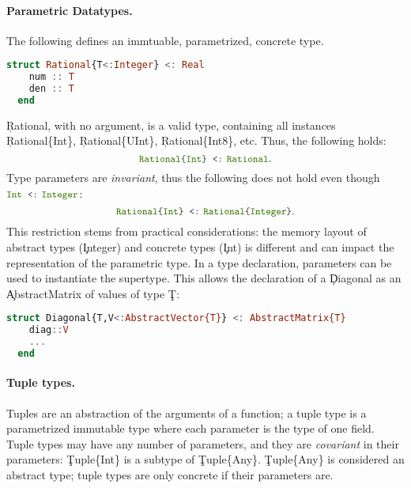 \paragraph{Parametric Datatypes.}
The following defines an immtuable, para\-metrized, concrete type.
\begin{lstlisting}[language=julia]
  struct Rational{T<:Integer} <: Real
    num :: T
    den :: T
  end
\end{lstlisting}
\noindent
\c{Rational}, with no argument, is a valid type, containing all instances
\c{Rational\{Int\}}, \c{Rational\{UInt\}}, \c{Rational\{Int8\}},
etc.  Thus, the following holds:
\[ \texttt{\small\color{jlbuiltin} Rational}   \texttt{\small\color{jlkeyword} \{}   \texttt{\small\color{jlbuiltin}\color{jlbuiltin} Int}   \texttt{\small\color{jlkeyword} \}\kern0pt}  \,\,\, \texttt{\small\color{jlkeyword} <:}\,\,   \texttt{\small\color{jlbuiltin} Rational}. \]
Type parameters are \emph{invariant}, thus the following does not hold
even though \( \texttt{\small\color{jlbuiltin}\color{jlbuiltin} Int} \,\,\, \texttt{\small\color{jlkeyword} <:}\,\, \texttt{\small\color{jlbuiltin}\color{jlbuiltin} Integer} \):
\[ \texttt{\small\color{jlbuiltin} Rational}   \texttt{\small\color{jlkeyword} \{}   \texttt{\small\color{jlbuiltin}\color{jlbuiltin} Int}   \texttt{\small\color{jlkeyword} \}\kern0pt}  \,\,\, \texttt{\small\color{jlkeyword} <:}\,\,   \texttt{\small\color{jlbuiltin} Rational}   \texttt{\small\color{jlkeyword} \{}   \texttt{\small\color{jlbuiltin} Integer}   \texttt{\small\color{jlkeyword} \}\kern0pt}.\]
This restriction stems from
practical considerations: the memory layout of abstract types
(\c{Integer}) and concrete types (\c{Int}) is different and can impact
the representation of the parametric type.  In a type declaration,
parameters can be used to instantiate the supertype.  This allows the
declaration of a \c{Diagonal} as an
\c{AbstractMatrix} of values of type \c{T}:
\begin{lstlisting}[language=julia]
  struct Diagonal{T,V<:AbstractVector{T}} <: AbstractMatrix{T}
    diag::V
    ...
  end
\end{lstlisting}

\paragraph{Tuple types.}
Tuples are an abstraction of the arguments of a function; a tuple type is a
parametrized immutable type where each parameter is the type of one field.
Tuple types may have any number of parameters, and they are \emph{covariant}
in their parameters: \c{Tuple\{Int\}} is a subtype of \c{Tuple\{Any\}}.
\c{Tuple\{Any\}} is considered an abstract type; tuple types are only
concrete if their parameters are.

